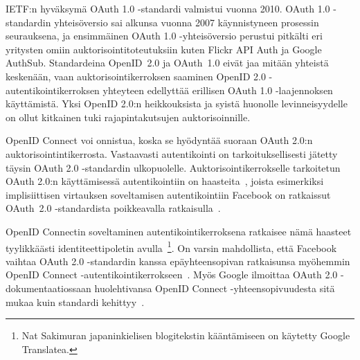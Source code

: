 \documentclass[finnish,gradu]{tktltiki}
\begin{document}
  IETF:n hyväksymä OAuth 1.0 -standardi valmistui vuonna 2010. OAuth 1.0 -stan\-dar\-din yhteisöversio sai alkunsa vuonna 2007 käynnistyneen prosessin seurauksena, ja ensimmäinen OAuth 1.0 -yhteisöversio perustui pitkälti eri yritysten omiin auktorisointitoteutuksiin kuten Flickr API Auth ja Google AuthSub. Standardeina \mbox{OpenID 2.0} ja \mbox{OAuth 1.0} eivät jaa mitään yhteistä keskenään, vaan auktorisointikerroksen saaminen OpenID 2.0 -autenti\-kointi\-kerroksen yhteyteen edellyttää erillisen OAuth 1.0 -laajennoksen käyttämistä. Yksi OpenID 2.0:n heikkouksista ja syistä huonolle levinneisyydelle on ollut kitkainen tuki rajapintakutsujen auktorisoinnille.

  OpenID Connect voi onnistua, koska se hyödyntää suoraan OAuth 2.0:n auktorisointintikerrosta. Vastaavasti autentikointi on tarkoituksellisesti jätetty täysin OAuth 2.0 -standardin ulkopuolelle. Auktorisointikerrokselle tarkoitetun OAuth 2.0:n käyttämisessä autentikointiin on haasteita~\cite{bradley_oauth_authentication_problem_2012, bradley_oauth_implicit_flow_vulnerability_2012}, joista esimerkiksi implisiittisen virtauksen soveltamisen autentikointiin Facebook on ratkaissut \mbox{OAuth 2.0} -standar\-dista poikkeavalla ratkaisulla~\cite{bradley_facebook_id_tokens_2012, facebook_oauth2_signed_request}.

  OpenID Connectin soveltaminen autentikointikerroksena ratkaisee nämä haasteet tyylikkäästi identiteettipoletin avulla~\cite{bradley_openid_c_id_token_2012, bradley_facebook_for_authentication_2012, sakimura_oauth_authentication_problem_2012}\footnote{Nat Sakimuran japaninkielisen blogitekstin kääntämiseen on käytetty Google Translatea.}. On varsin mahdollista, että Facebook vaihtaa OAuth 2.0 -standardin kanssa epäyhteensopivan ratkaisunsa myöhemmin OpenID Connect -autentikointikerrokseen~\cite{bradley_facebook_id_tokens_2012, facebook_oauth2_signed_request}. Myös Google ilmoittaa OAuth 2.0 -dokumentaatiossaan huolehtivansa OpenID Connect -yh\-teen\-sopi\-vuudesta sitä mukaa kuin standardi kehittyy~\cite{google_oauth2_login}.

\end{document}
